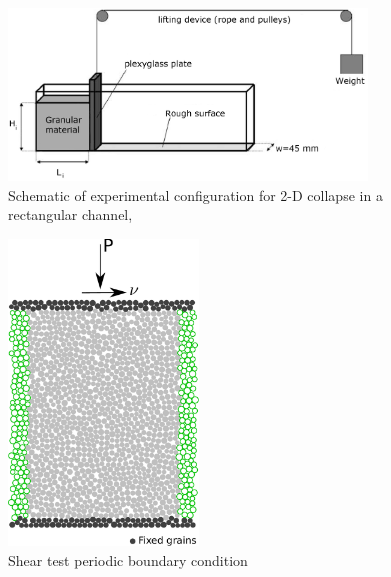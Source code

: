 \begin{figure}[tbhp]
\centering
\includegraphics[width=0.85\textwidth]{experiment_setup}
\caption{Schematic of experimental configuration for 2-D collapse in a 
rectangular channel,~\citep{Lajeunesse2004}}
\label{fig:exp}
\end{figure}


\begin{figure}[tbhp]
\centering
\includegraphics[width=0.45\textwidth]{simple_shear}
\caption{Shear test periodic boundary condition}
\label{fig:shear}
\end{figure}

